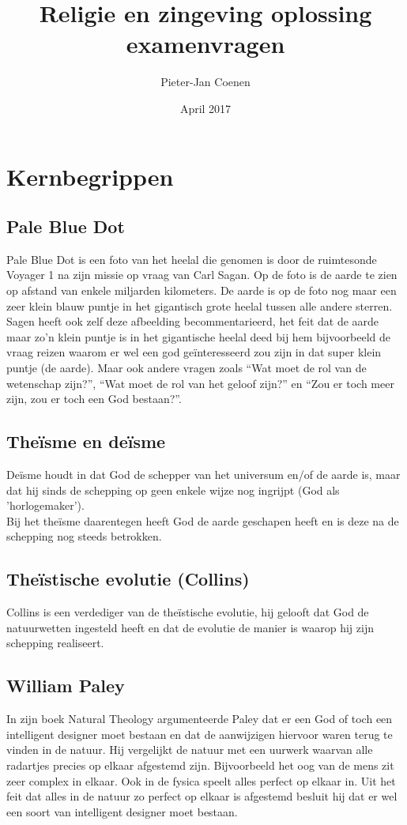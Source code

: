 \documentclass[11pt,a4paper,titlepage]{article}
\title{Religie en zingeving oplossing examenvragen}
\author{Pieter-Jan Coenen}
\date{April 2017}
\begin{document}
\maketitle
\newpage
\tableofcontents
\newpage

\section{Kernbegrippen}
\subsection{Pale Blue Dot}
Pale Blue Dot is een foto van het heelal die genomen is door de ruimtesonde Voyager 1 na zijn missie op vraag van Carl Sagan. Op de foto is de aarde te zien op afstand van enkele miljarden kilometers. De aarde is op de foto nog maar een zeer klein blauw puntje in het gigantisch grote heelal tussen alle andere sterren.\\
Sagen heeft ook zelf deze afbeelding becommentarieerd, het feit dat de aarde maar zo'n klein puntje is in het gigantische heelal deed bij hem bijvoorbeeld de vraag reizen waarom er wel een god geïnteresseerd zou zijn in dat super klein puntje (de aarde). Maar ook andere vragen zoals ``Wat moet de rol van de wetenschap zijn?'', ``Wat moet de rol van het geloof zijn?''  en ``Zou er toch meer zijn, zou er toch een God bestaan?''.

\subsection{Theïsme en deïsme}
Deïsme houdt in dat God de schepper van het universum en/of de aarde is, maar dat hij sinds de schepping op geen enkele wijze nog ingrijpt (God als 'horlogemaker').\\ Bij het theïsme daarentegen heeft God de aarde geschapen heeft en is deze na de schepping nog steeds betrokken.
\subsection{Theïstische evolutie (Collins)}
Collins is een verdediger van de theïstische evolutie, hij gelooft dat God de natuurwetten ingesteld heeft en dat de evolutie de manier is waarop hij zijn schepping realiseert.

\subsection{William Paley}
In zijn boek Natural Theology argumenteerde Paley dat er een God of toch een intelligent designer moet bestaan en dat de aanwijzigen hiervoor waren terug te vinden in de natuur. Hij vergelijkt de natuur met een uurwerk waarvan alle radartjes precies op elkaar afgestemd zijn. Bijvoorbeeld het oog van de mens zit zeer complex in elkaar.  Ook in de fysica speelt alles perfect op elkaar in. Uit het feit dat alles in de natuur zo perfect op elkaar is afgestemd besluit hij dat er wel een soort van intelligent designer moet bestaan.
\end{document}
